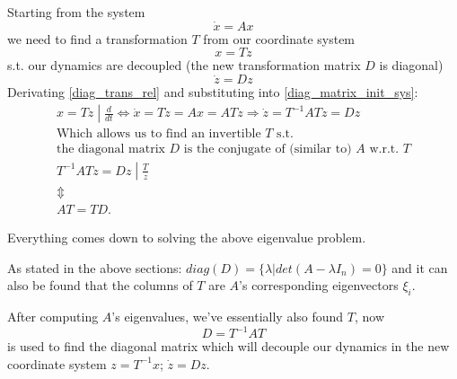 Starting from the system
\begin{equation}\label{diag_matrix_init_sys}
				\dot{x} = A x
\end{equation}
we need to find a transformation $T$ from our coordinate system
\begin{equation}\label{diag_trans_rel}
				x = Tz
\end{equation}
s.t. our dynamics are decoupled (the new transformation matrix $D$ is diagonal)
\[
				\dot{z} = Dz
\]
Derivating \ref{diag_trans_rel} and substituting into \ref{diag_matrix_init_sys}:
\begin{gather*}
				\left. x = Tz \middle| \frac{d}{dt} \right. \iff
				\dot{x} = T\dot{z} = Ax = ATz \Rightarrow \dot{z} = T^{-1} A T z = Dz \\
				\text{Which allows us to find an invertible } T \text{ s.t.} \\
				\text{the diagonal matrix } D \text{ is the conjugate of (similar to) } A \text{ w.r.t. } T \\
				\left. T^{-1} A T z = Dz \middle| \frac{T}{z}
				\right. \\
				\Updownarrow \\
				A T = T D.
\end{gather*}

Everything comes down to solving the above eigenvalue problem.

As stated in the above sections: $diag(D) = \{ \lambda | det(A - \lambda I_n) = 0 \}$ and it can also be found that the columns of $T$ are $A$'s corresponding eigenvectors $\xi_i$.

After computing $A$'s eigenvalues, we've essentially also found $T$, now
\[
				D = T^{-1} A T
\]
is used to find the diagonal matrix which will decouple our dynamics in the new coordinate system $z = T^{-1} x$; $\dot{z} = D z$.

